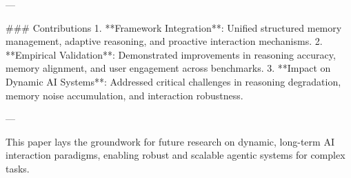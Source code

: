 ---

### Contributions  
1. **Framework Integration**: Unified structured memory management, adaptive reasoning, and proactive interaction mechanisms.  
2. **Empirical Validation**: Demonstrated improvements in reasoning accuracy, memory alignment, and user engagement across benchmarks.  
3. **Impact on Dynamic AI Systems**: Addressed critical challenges in reasoning degradation, memory noise accumulation, and interaction robustness.

--- 

This paper lays the groundwork for future research on dynamic, long-term AI interaction paradigms, enabling robust and scalable agentic systems for complex tasks.